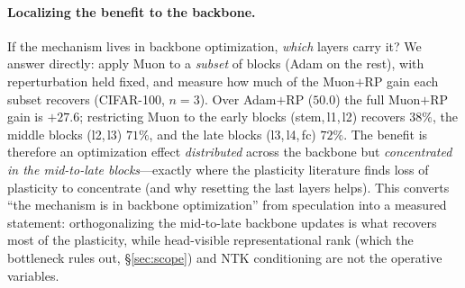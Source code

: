 \documentclass[letterpaper]{article} %
\begin{document}
\paragraph{Localizing the benefit to the backbone.} If the mechanism lives in backbone optimization, \emph{which} layers carry it? We answer directly: apply Muon to a \emph{subset} of blocks (Adam on the rest), with reperturbation held fixed, and measure how much of the Muon$+$RP gain each subset recovers (CIFAR-100, $n{=}3$). Over Adam$+$RP ($50.0$) the full Muon$+$RP gain is $+27.6$; restricting Muon to the early blocks (stem,\,l1,\,l2) recovers $38\%$, the middle blocks (l2,\,l3) $71\%$, and the late blocks (l3,\,l4,\,fc) $72\%$. The benefit is therefore an optimization effect \emph{distributed} across the backbone but \emph{concentrated in the mid-to-late blocks}---exactly where the plasticity literature finds loss of plasticity to concentrate (and why resetting the last layers helps). This converts ``the mechanism is in backbone optimization'' from speculation into a measured statement: orthogonalizing the mid-to-late backbone updates is what recovers most of the plasticity, while head-visible representational rank (which the bottleneck rules out, \S\ref{sec:scope}) and NTK conditioning are not the operative variables.
\end{document}
